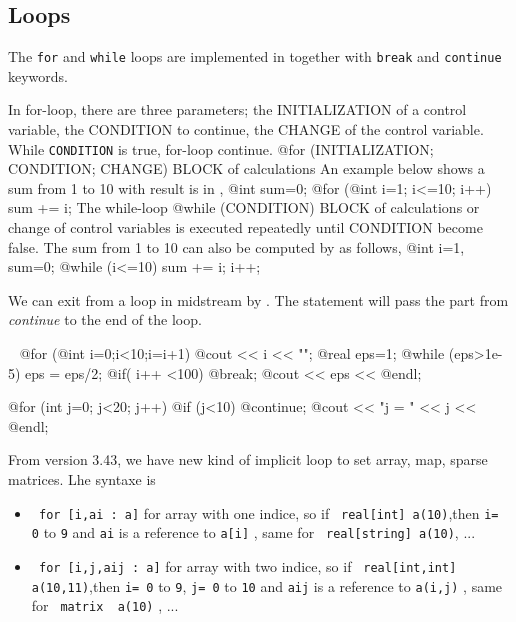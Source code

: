 \documentclass[a4paper,twoside,12pt]{book}
\def\n{\nabla}
\def\setS#1{#1\label{sec:#1}}
\begin{document}
\eFF


\subsection{\setS{Loops}}

The \texttt{for} and \texttt{while}  loops are implemented in \freefempp together
with \texttt{break} and \texttt{continue} keywords.

In for-loop, there are three parameters;
the INITIALIZATION of a control variable,
the CONDITION to continue,
the CHANGE of the control variable.
While \texttt{CONDITION} is true, for-loop continue.
\bFF
@for (INITIALIZATION; CONDITION; CHANGE)
     { BLOCK of calculations }
\eFF
An example below shows a sum from 1 to 10 with result is in ,
\bFF
@int sum=0;
@for (@int i=1; i<=10; i++)
   sum += i;
\eFF
The while-loop
\bFF
@while (CONDITION) {
   BLOCK of calculations or change of control variables
}
\eFF
is executed repeatedly until CONDITION become false.
The sum from 1 to 10 can also be computed by  as follows,
\bFF
@int i=1, sum=0;
@while (i<=10) {
  sum += i; i++;
}
\eFF

We can exit from a loop in midstream by .
The  statement will pass the part from
\emph{continue} to the end of the loop.

\begin{example}~
\bFF
@for (@int i=0;i<10;i=i+1)
    @cout << i << "\n";
@real eps=1;
@while (eps>1e-5)
 { eps = eps/2;
   @if( i++ <100) @break;
   @cout << eps << @endl;}

@for (int j=0; j<20; j++) {
   @if (j<10) @continue;
   @cout << "j = " << j << @endl;
}
\eFF
\end{example}

From version 3.43, we have new kind of implicit loop to set array, map, sparse matrices.
Lhe syntaxe is

\begin{itemize}
\item   \verb! for [i,ai : a]! for array with one indice, so if  \verb! real[int] a(10)!,then \texttt{i= 0} to \texttt{9} and
\texttt{ai} is a reference to  \texttt{a[i]} , same for  \verb! real[string] a(10)!, ...
\item \verb! for [i,j,aij : a]! for array with two  indice, so if  \verb! real[int,int] a(10,11)!,then \texttt{i= 0} to \texttt{9},
\texttt{j= 0} to \texttt{10} and 
\texttt{aij} is a reference to  \texttt{a(i,j)} , same for  \verb! matrix  a(10)! , ...
\end{itemize}
\end{document}
